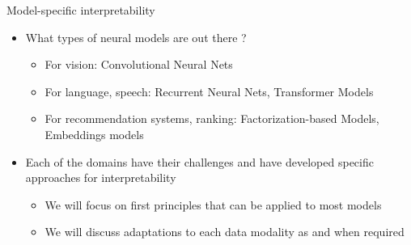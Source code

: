 \documentclass[aspectratio=169]{../latex_main/tntbeamer}
\begin{document}
\begin{frame}[c]{Model-specific interpretability}
	\begin{itemize}
		\item What types of neural models are out there ?
		\begin{itemize}
			\item For vision: Convolutional Neural Nets
			\item For language, speech: Recurrent Neural Nets, Transformer Models
			\item For recommendation systems, ranking: Factorization-based Models, Embeddings
models
		\end{itemize}
		\item Each of the domains have their challenges and have developed specific approaches for
interpretability
		\begin{itemize}
			\item We will focus on first principles that can be applied to most models
			\item We will discuss adaptations to each data modality as and when required
		\end{itemize}
	\end{itemize}
	
\end{frame}


\end{document}
